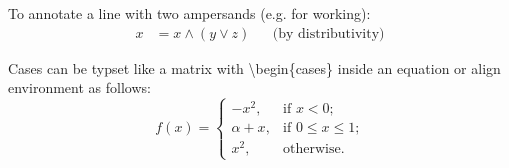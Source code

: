 \documentclass{sample}
\begin{document}
To annotate a line with two ampersands (e.g. for working):
\begin{align}
x &= x \wedge (y \vee z) &&\text{(by distributivity)}
\end{align}

Cases can be typset like a matrix with \textbackslash begin\{cases\} inside an equation or align environment as follows:
\[
f(x)=
\begin{cases}
-x^2, &\text{if $x < 0$;}\\
\alpha + x, &\text{if $0 \leq x \leq 1$;}\\
x^2, &\text{otherwise.}
\end{cases}
\]
\end{document}
